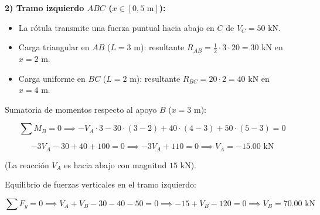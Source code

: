 \textbf{2) Tramo izquierdo $ABC$ ($x \in [0, 5\text{ m}]$):}

\begin{itemize}

    \item La rótula transmite una fuerza puntual hacia abajo en $C$ de $V_C = 50\text{ kN}$.

    \item Carga triangular en $AB$ ($L=3\text{ m}$): resultante $R_{AB} = \frac{1}{2} \cdot 3 \cdot 20 = 30\text{ kN}$ en $x = 2\text{ m}$.

    \item Carga uniforme en $BC$ ($L=2\text{ m}$): resultante $R_{BC} = 20 \cdot 2 = 40\text{ kN}$ en $x = 4\text{ m}$.

\end{itemize}



Sumatoria de momentos respecto al apoyo $B$ ($x = 3\text{ m}$):

\begin{equation}

    \sum M_B = 0 \implies -V_A \cdot 3 - 30 \cdot (3 - 2) + 40 \cdot (4 - 3) + 50 \cdot (5 - 3) = 0

\end{equation}

\begin{equation}

    -3 V_A - 30 + 40 + 100 = 0 \implies -3 V_A + 110 = 0 \implies V_A = -15.00\text{ kN}

\end{equation}

(La reacción $V_A$ es hacia abajo con magnitud $15\text{ kN}$).



Equilibrio de fuerzas verticales en el tramo izquierdo:

\begin{equation}

    \sum F_y = 0 \implies V_A + V_B - 30 - 40 - 50 = 0 \implies -15 + V_B - 120 = 0 \implies \boxed{V_B = 70.00\text{ kN}}

\end{equation}






